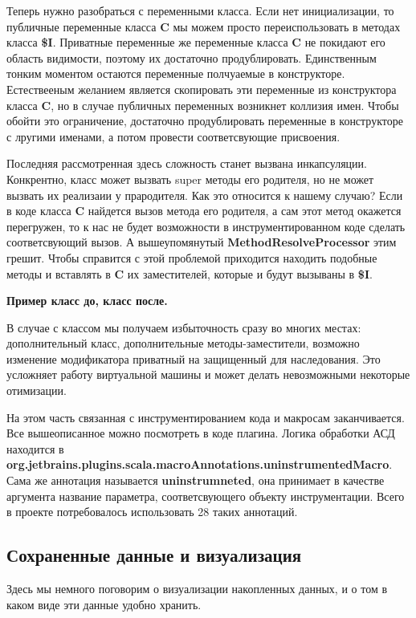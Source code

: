Теперь нужно разобраться с переменными класса.
Если нет инициализации, то публичные переменные класса \textbf{C} мы можем
просто переиспользовать в методах класса \textbf{\$I}.
Приватные переменные же переменные класса \textbf{C} не покидают его область
видимости, поэтому их достаточно продублировать.
Единственным тонким моментом остаются переменные полчуаемые в конструкторе.
Естествееным желанием является скопировать эти переменные из конструктора
класса \textbf{C}, но в случае публичных переменных возникнет коллизия имен.
Чтобы обойти это ограничение, достаточно продублировать переменные в конструкторе
с лругими именами, а потом провести соответсвующие присвоения.

Последняя рассмотренная здесь сложность станет вызвана инкапсуляции.
Конкрентно, класс может вызвать super методы его родителя, но не может вызвать
их реализаии у прародителя.
Как это относится к нашему случаю?
Если в коде класса \textbf{C} найдется вызов метода его родителя,
а сам этот метод окажется перегружен, то к нас не будет возможности в
инструментированном коде сделать соответсвующий вызов.
А вышеупомянутый \textbf{MethodResolveProcessor} этим грешит.
Чтобы справится с этой проблемой приходится находить подобные методы и
вставлять в \textbf{C} их заместителей, которые и будут вызываны в \textbf{\$I}.

\textbf{Пример класс до, класс после.}

В случае с классом мы получаем избыточность сразу во многих местах:
дополнительный класс, дополнительные методы-заместители, возможно изменение
модификатора приватный на защищенный для наследования.
Это усложняет работу виртуальной машины и может делать невозможными некоторые
отимизации.

На этом часть связанная с инструментированием кода и макросам заканчивается.
Все вышеописанное можно посмотреть в коде плагина.
Логика обработки АСД находится в
\textbf{org.jetbrains.plugins.scala.macroAnnotations.uninstrumentedMacro}.
Сама же аннотация называется \textbf{uninstrumneted}, она принимает в качестве
аргумента название параметра, соответсвующего объекту инструментации.
Всего в проекте потребовалось использовать 28 таких аннотаций.

\subsection{Сохраненные данные и визуализация}
\label{sec:data}

Здесь мы немного поговорим о визуализации накопленных данных,
и о том в каком виде эти данные удобно хранить.

